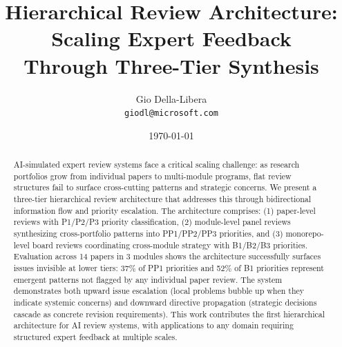 \documentclass[11pt,letterpaper]{article}
\title{Hierarchical Review Architecture: Scaling Expert Feedback\\Through Three-Tier Synthesis}
\author{
Gio Della-Libera \\
\texttt{giodl@microsoft.com}
}
\date{\today}
\begin{document}
\maketitle

\begin{abstract}
AI-simulated expert review systems face a critical scaling challenge: as research portfolios grow from individual papers to multi-module programs, flat review structures fail to surface cross-cutting patterns and strategic concerns. We present a three-tier hierarchical review architecture that addresses this through bidirectional information flow and priority escalation. The architecture comprises: (1) paper-level reviews with P1/P2/P3 priority classification, (2) module-level panel reviews synthesizing cross-portfolio patterns into PP1/PP2/PP3 priorities, and (3) monorepo-level board reviews coordinating cross-module strategy with B1/B2/B3 priorities. Evaluation across 14 papers in 3 modules shows the architecture successfully surfaces issues invisible at lower tiers: 37\% of PP1 priorities and 52\% of B1 priorities represent emergent patterns not flagged by any individual paper review. The system demonstrates both upward issue escalation (local problems bubble up when they indicate systemic concerns) and downward directive propagation (strategic decisions cascade as concrete revision requirements). This work contributes the first hierarchical architecture for AI review systems, with applications to any domain requiring structured expert feedback at multiple scales.
\end{abstract}










\end{document}
